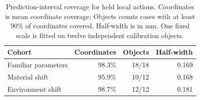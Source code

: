 \begin{table}[t]
\centering\small\setlength{\tabcolsep}{3pt}
\begin{tabular}{lrrr}
\toprule
Cohort & Coordinates & Objects & Half-width \\
\midrule
Familiar parameters & 98.3\% & 18/18 & 0.169 \\
Material shift & 95.9\% & 10/12 & 0.168 \\
Environment shift & 98.7\% & 12/12 & 0.181 \\
\bottomrule
\end{tabular}
\caption{Prediction-interval coverage for held local actions. Coordinates is mean coordinate coverage; Objects counts cases with at least 90\% of coordinates covered. Half-width is in mm. One fixed scale is fitted on twelve independent calibration objects.}
\label{tab:coverage}
\end{table}
